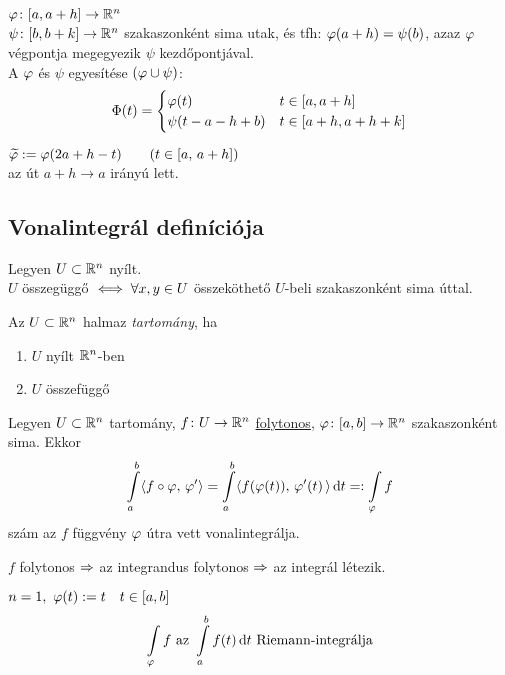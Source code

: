 \begin{de}
  $\varphi\colon [a,a+h]\to\mathbb{R}^n$\\$\psi\colon[b,b+k]\to\mathbb{R}^n$ szakaszonként sima utak, és tfh: $\varphi(a+h)=\psi(b)$, azaz
  $\varphi$ végpontja megegyezik $\psi$ kezdőpontjával. \\
  A $\varphi$ és $\psi$ egyesítése $(\varphi\cup\psi)$:
\[\Phi(t) = \begin{cases}\varphi(t) & t\in[a,a+h]\\\psi(t-a-h+b) & t\in[a+h,a+h+k]\end{cases}\]
\end{de}

\begin{de} $\widetilde{\varphi} := \varphi(2a+h-t)\qquad(t\in[a,\,a+h])$\\
  az út $a+h\to a$ irányú lett.
\end{de}

\subsection{Vonalintegrál definíciója}
\begin{te}Legyen $U\subset \mathbb{R}^n$ nyílt.\\
  $U$ összegüggő $\iff \forall x,y\in  U$ összeköthető $U$-beli szakaszonként
  sima úttal.
\end{te}

\begin{de}[Tartomány]Az $U\subset \mathbb{R}^n$ halmaz \emph{tartomány}, ha
{\listazjromai
  \begin{enumerate}
    \item $U$ nyílt $\mathbb{R}^n$-ben
    \item $U$ összefüggő
  \end{enumerate}
}
\end{de}
\begin{de}
  Legyen $U\subset \mathbb{R}^n$ tartomány, $f\colon U\to\mathbb{R}^n$ \underline{folytonos}, $\varphi\colon [a,b]\to\mathbb{R}^n$ szakaszonként
  sima. Ekkor
\[\Int_a^b\skalar{f\circ\vfi}{\vfi'} = \Int_a^b\skalar{f(\vfi(t))}{\vfi'(t)\,}\diff t =: \Int_\vfi f\]
szám az $f$ függvény $\varphi$ útra vett vonalintegrálja.
\end{de}

\begin{Megj}
  \item $f$ folytonos $\Rightarrow$ az integrandus folytonos $\Rightarrow$ az integrál létezik.
\item $n=1,\ \varphi(t) := t\quad t\in[a,b]$
\[\Int_\vfi f \text{ az } \Int_a^bf(t)\diff t \text{ Riemann-integrálja}\]
\end{Megj}

